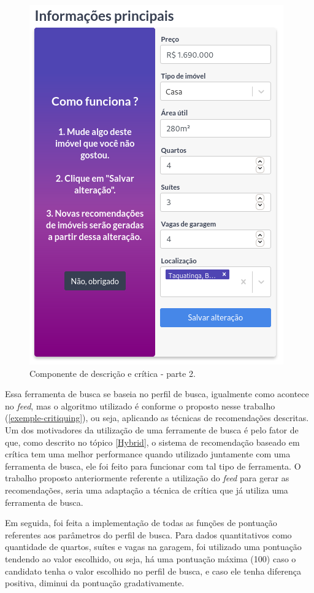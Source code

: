 \begin{figure}[H]
    \centering
    \includegraphics[scale=0.45]{figuras/desenvolvimento/componente_critica2.png}
    \caption[Componente de descrição e crítica - parte 2]{Componente de descrição e crítica - parte 2.}
    \label{fig:componente_critica2}
\end{figure}

Essa ferramenta de busca se baseia no perfil de busca, igualmente como acontece no \textit{feed}, mas o algoritmo utilizado é conforme o proposto nesse trabalho (\ref{exemple-critiquing}), ou seja, aplicando as técnicas de recomendações descritas. Um dos motivadores da utilização de uma ferramente de busca é pelo fator de que, como descrito no tópico \ref{Hybrid}, o sistema de recomendação baseado em crítica tem uma melhor performance quando utilizado juntamente com uma ferramenta de busca, ele foi feito para funcionar com tal tipo de ferramenta. O trabalho proposto anteriormente referente a utilização do \textit{feed} para gerar as recomendações, seria uma adaptação a técnica de crítica que já utiliza uma ferramenta de busca.

Em seguida, foi feita a implementação de todas as funções de pontuação referentes aos parâmetros do perfil de busca. Para dados quantitativos como quantidade de quartos, suítes e vagas na garagem, foi utilizado uma pontuação tendendo ao valor escolhido, ou seja, há uma pontuação máxima (100) caso o candidato tenha o valor escolhido no perfil de busca, e caso ele tenha diferença positiva, diminui da pontuação gradativamente.

